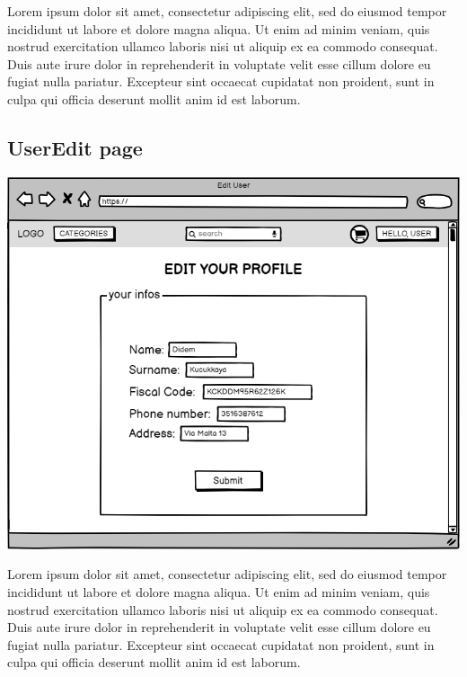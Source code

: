    Lorem ipsum dolor sit amet, consectetur adipiscing elit, sed do eiusmod tempor incididunt ut labore et dolore magna aliqua. Ut enim ad minim veniam, quis nostrud exercitation ullamco laboris nisi ut aliquip ex ea commodo consequat. Duis aute irure dolor in reprehenderit in voluptate velit esse cillum dolore eu fugiat nulla pariatur. Excepteur sint occaecat cupidatat non proident, sunt in culpa qui officia deserunt mollit anim id est laborum.


\subsection{UserEdit page}
    \includegraphics[width=\textwidth,height=\textheight,keepaspectratio]{mockups/userEditPageMockup.png}

    Lorem ipsum dolor sit amet, consectetur adipiscing elit, sed do eiusmod tempor incididunt ut labore et dolore magna aliqua. Ut enim ad minim veniam, quis nostrud exercitation ullamco laboris nisi ut aliquip ex ea commodo consequat. Duis aute irure dolor in reprehenderit in voluptate velit esse cillum dolore eu fugiat nulla pariatur. Excepteur sint occaecat cupidatat non proident, sunt in culpa qui officia deserunt mollit anim id est laborum.


